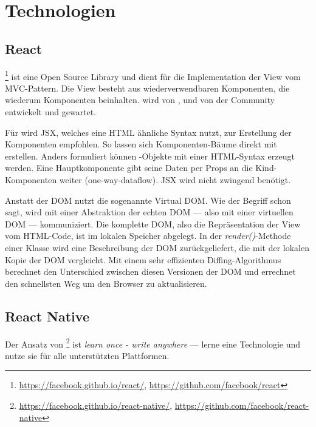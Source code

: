 \chapter{Technologien}
\label{pd-technologien}

\section{React} 
\footnote{\url{https://facebook.github.io/react/}, \url{https://github.com/facebook/react}} ist eine Open Source  \gls{Library} und dient für die Implementation der View vom \gls{MVC}-Pattern. 
Die View besteht aus wiederverwendbaren Komponenten, die wiederum Komponenten beinhalten.
 wird von ,  und von der Community entwickelt und gewartet. 
\cite{react}

Für  wird \gls{JSX}, welches eine HTML ähnliche Syntax nutzt, zur Erstellung der Komponenten empfohlen. 
So lassen sich Komponenten-Bäume direkt mit  erstellen. 
Anders formuliert können -Objekte mit einer HTML-Syntax erzeugt werden. 
Eine Hauptkomponente gibt seine Daten per Props an die Kind-Komponenten weiter (one-way-dataflow). 
\gls{JSX} wird nicht zwingend benötigt. 

Anstatt der \gls{DOM} nutzt  die sogenannte \gls{Virtual DOM}.
Wie der Begriff schon sagt, wird mit einer Abstraktion der echten \gls{DOM} --- also mit einer virtuellen DOM --- kommuniziert.
Die komplette \gls{DOM}, also die Repräsentation der View vom HTML-Code, ist im lokalen Speicher abgelegt.\cite{virtual-dom}
In der \textit{render()}-Methode einer Klasse wird eine Beschreibung der DOM zurückgeliefert, die  mit der lokalen Kopie der \gls{DOM} vergleicht.
Mit einem sehr effizienten Diffing-Algorithmus berechnet  den Unterschied zwischen diesen  Versionen der \gls{DOM} und errechnet den schnellsten Weg um den Browser zu aktualisieren. 
\cite{react-virtual-dom}

\section{React Native}
Der Ansatz von \footnote{\url{https://facebook.github.io/react-native/}, \url{https://github.com/facebook/react-native}} ist \textit{learn once - write anywhere} --- lerne eine Technologie und nutze sie für alle unterstützten Plattformen.\cite{react-native}


